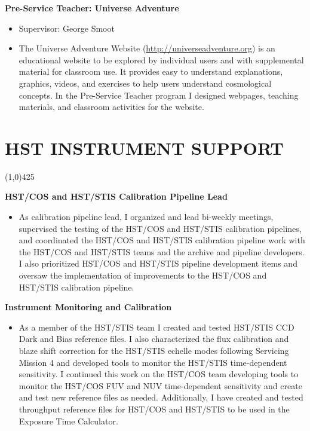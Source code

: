 \documentclass{res}
\begin{document}
\begin{resume}
   {\bf Pre-Service Teacher: Universe Adventure}
   		\begin{itemize}
   		\item[] Supervisor: George Smoot
		\item[] The Universe Adventure Website ({\color{blue}\url{http://universeadventure.org}}) is an educational website to be explored by individual users and with supplemental material for classroom use. It provides easy to understand explanations, graphics, videos, and exercises to help users understand cosmological concepts. In the Pre-Service Teacher program I designed webpages, teaching materials, and classroom activities for the website.

		\end{itemize}

\section{HST INSTRUMENT SUPPORT} 
\vspace{-.2in}
\begin{center}
\line(1,0){425}
\end{center}
\vspace{-.3in}
\vspace{0.1in}

	{\bf HST/COS and HST/STIS Calibration Pipeline Lead}
		\begin{itemize}
		\item[]  As calibration pipeline lead, I organized and lead bi-weekly meetings, supervised the testing of the HST/COS and HST/STIS calibration pipelines, and coordinated the HST/COS and HST/STIS calibration pipeline work with the HST/COS and HST/STIS teams and the archive and pipeline developers. I also prioritized HST/COS and HST/STIS pipeline development items and oversaw the implementation of improvements to the HST/COS and HST/STIS calibration pipeline.
		\end{itemize}


   {\bf  Instrument Monitoring and Calibration}
        \begin{itemize}
        \item[]  As a member of the HST/STIS team I created and tested HST/STIS CCD Dark and Bias reference files. I also characterized the flux calibration and blaze shift correction for the HST/STIS echelle modes following Servicing Mission 4 and developed tools to monitor the HST/STIS time-dependent sensitivity. I continued this work on the HST/COS team developing tools to monitor the HST/COS FUV and NUV time-dependent sensitivity and create and test new reference files as needed. Additionally, I have created and tested throughput reference files for HST/COS and HST/STIS to be used in the Exposure Time Calculator.
		\end{itemize}
		

\end{resume}
\end{document}

